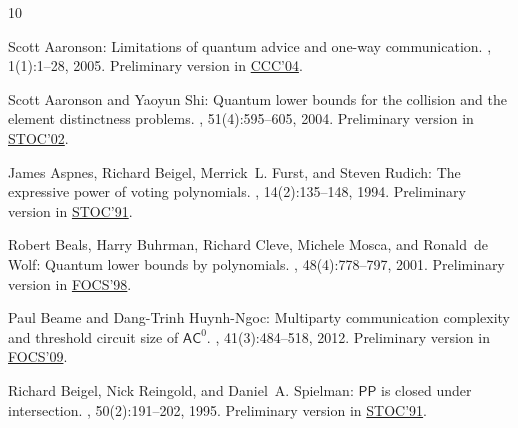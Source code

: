 \tocrefpdfbookmark
\begin{thebibliography}{10}

{\sc Scott Aaronson}: Limitations of quantum advice and one-way communication.
, 1(1):1--28, 2005.
\newblock Preliminary version in
  \href{http://dx.doi.org/10.1109/CCC.2004.1313854}{CCC'04}.

{\sc Scott Aaronson and Yaoyun Shi}: Quantum lower bounds for the collision and
  the element distinctness problems.
, 51(4):595--605, 2004.
\newblock Preliminary version in
  \href{http://dx.doi.org/10.1145/509907.509999}{STOC'02}.
\newblock [\epfmtdoi{10.1145/1008731.1008735}]

{\sc James Aspnes, Richard Beigel, Merrick~L. Furst, and Steven Rudich}: The
  expressive power of voting polynomials.
, 14(2):135--148, 1994.
\newblock Preliminary version in
  \href{http://dx.doi.org/10.1145/103418.103461}{STOC'91}.
\newblock [\epfmtdoi{10.1007/BF01215346}]

{\sc Robert Beals, Harry Buhrman, Richard Cleve, Michele Mosca, and Ronald~de
  Wolf}: Quantum lower bounds by polynomials.
, 48(4):778--797, 2001.
\newblock Preliminary version in
  \href{http://dx.doi.org/10.1109/SFCS.1998.743485}{FOCS'98}.
\newblock [\epfmtdoi{10.1145/502090.502097}]

{\sc Paul Beame and Dang-Trinh {Huynh-Ngoc}}: Multiparty communication
  complexity and threshold circuit size of {$\mathsf{AC}^0$}.
, 41(3):484--518, 2012.
\newblock Preliminary version in
  \href{http://dx.doi.org/10.1109/FOCS.2009.12}{FOCS'09}.
\newblock [\epfmtdoi{10.1137/100792779}]

{\sc Richard Beigel, Nick Reingold, and Daniel~A. Spielman}: {$\mathsf{PP}$} is
  closed under intersection.
, 50(2):191--202, 1995.
\newblock Preliminary version in
  \href{http://dx.doi.org/10.1145/103418.103426}{STOC'91}.


\end{thebibliography}

